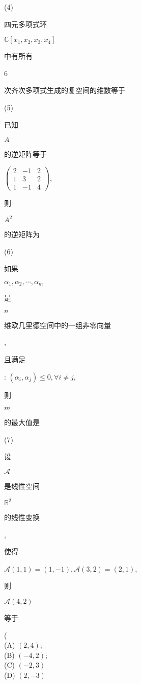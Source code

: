 \documentclass[10pt]{article}
\begin{document}
(4) \begin{CJK}{UTF8}{mj}四元多项式环\end{CJK} $\mathbb{C}\left[x_{1}, x_{2}, x_{3}, x_{4}\right]$ \begin{CJK}{UTF8}{mj}中有所有\end{CJK} 6 \begin{CJK}{UTF8}{mj}次齐次多项式生成的复空间的维数等于\end{CJK}

(5) \begin{CJK}{UTF8}{mj}已知\end{CJK} $A$ \begin{CJK}{UTF8}{mj}的逆矩阵等于\end{CJK} $\left(\begin{array}{ccc}2 & -1 & 2 \\ 1 & 3 & 2 \\ 1 & -1 & 4\end{array}\right)$, \begin{CJK}{UTF8}{mj}则\end{CJK} $A^{2}$ \begin{CJK}{UTF8}{mj}的逆矩阵为\end{CJK}

(6) \begin{CJK}{UTF8}{mj}如果\end{CJK} $\alpha_{1}, \alpha_{2}, \cdots, \alpha_{m}$ \begin{CJK}{UTF8}{mj}是\end{CJK} $n$ \begin{CJK}{UTF8}{mj}维欧几里德空间中的一组非零向量\end{CJK}, \begin{CJK}{UTF8}{mj}且满足\end{CJK}: $\left(\alpha_{i}, \alpha_{j}\right) \leqslant 0, \forall i \neq j$, \begin{CJK}{UTF8}{mj}则\end{CJK} $m$ \begin{CJK}{UTF8}{mj}的最大值是\end{CJK}

(7) \begin{CJK}{UTF8}{mj}设\end{CJK} $\mathscr{A}$ \begin{CJK}{UTF8}{mj}是线性空间\end{CJK} $\mathbb{R}^{2}$ \begin{CJK}{UTF8}{mj}的线性变换\end{CJK}, \begin{CJK}{UTF8}{mj}使得\end{CJK} $\mathscr{A}(1,1)=(1,-1), \mathscr{A}(3,2)=(2,1)$, \begin{CJK}{UTF8}{mj}则\end{CJK} $\mathscr{A}(4,2)$ \begin{CJK}{UTF8}{mj}等于\end{CJK}(\\
(A) $(2,4)$;\\
(B) $(-4,2)$;\\
(C) $(-2,3)$\\
(D) $(2,-3)$
\end{document}
